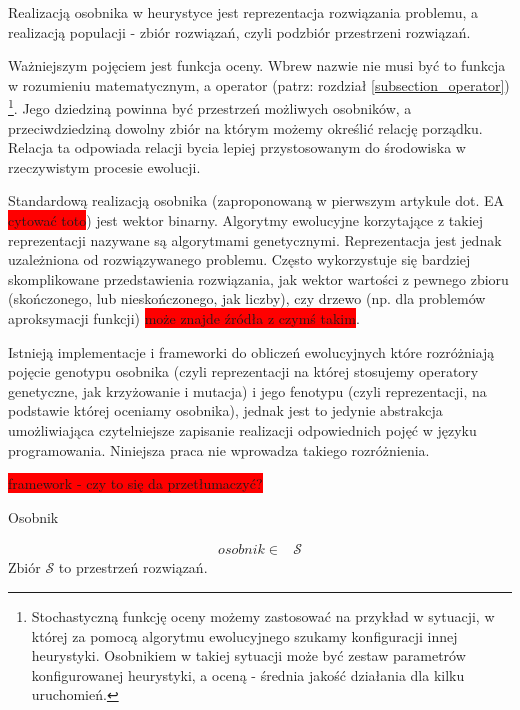\documentclass[twoside]{iisthesis}
\newcommand{\todo}{\colorbox{red}}
\newcommand{\important}{\mathcal}
\begin{document}
Realizacją osobnika w heurystyce jest reprezentacja rozwiązania problemu, a realizacją populacji - zbiór rozwiązań, czyli podzbiór przestrzeni rozwiązań.

Ważniejszym pojęciem jest funkcja oceny. Wbrew nazwie nie musi być to funkcja w rozumieniu matematycznym, a operator (patrz: rozdział \ref{subsection_operator}) \footnote{Stochastyczną funkcję oceny możemy zastosować na przykład w sytuacji, w której za pomocą algorytmu ewolucyjnego szukamy konfiguracji innej heurystyki. Osobnikiem w takiej sytuacji może być zestaw parametrów konfigurowanej heurystyki, a oceną - średnia jakość działania dla kilku uruchomień.}. Jego dziedziną powinna być przestrzeń możliwych osobników, a przeciwdziedziną dowolny zbiór na którym możemy określić relację porządku. Relacja ta odpowiada relacji bycia lepiej przystosowanym do środowiska w rzeczywistym procesie ewolucji.

Standardową realizacją osobnika (zaproponowaną w pierwszym artykule dot. EA \todo{cytować toto}) jest wektor binarny. Algorytmy ewolucyjne korzytające z takiej reprezentacji nazywane są algorytmami genetycznymi. Reprezentacja jest jednak uzależniona od rozwiązywanego problemu. Często wykorzystuje się bardziej skomplikowane przedstawienia rozwiązania, jak wektor wartości z pewnego zbioru (skończonego, lub nieskończonego, jak liczby), czy drzewo (np. dla problemów aproksymacji funkcji) \todo{może znajde źródła z czymś takim}.

Istnieją implementacje i frameworki do obliczeń ewolucyjnych które rozróżniają pojęcie genotypu osobnika (czyli reprezentacji na której stosujemy operatory genetyczne, jak krzyżowanie i mutacja) i jego fenotypu (czyli reprezentacji, na podstawie której oceniamy osobnika), jednak jest to jedynie abstrakcja umożliwiająca czytelniejsze zapisanie realizacji odpowiednich pojęć w języku programowania. Niniejsza praca nie wprowadza takiego rozróżnienia.

\todo{framework - czy to się da przetłumaczyć?}

\begin{signature}
	\caption{Osobnik \label{signature_specimen}}
	\begin{align}
	osobnik \in &\important{S}
	\end{align}
	Zbiór $\important{S}$ to przestrzeń rozwiązań.
\end{signature}
\end{document}
